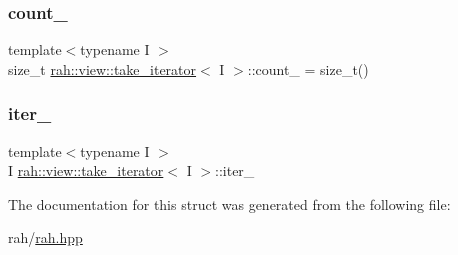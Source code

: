 \subsubsection{\texorpdfstring{count\_}{count\_}}
{\footnotesize\ttfamily template$<$typename I $>$ \\
size\+\_\+t \mbox{\hyperlink{structrah_1_1view_1_1take__iterator}{rah\+::view\+::take\+\_\+iterator}}$<$ I $>$\+::count\+\_\+ = size\+\_\+t()}

\mbox{\label{structrah_1_1view_1_1take__iterator_abbc947797abfa6ecaeb91c8185212152}} 
\subsubsection{\texorpdfstring{iter\_}{iter\_}}
{\footnotesize\ttfamily template$<$typename I $>$ \\
I \mbox{\hyperlink{structrah_1_1view_1_1take__iterator}{rah\+::view\+::take\+\_\+iterator}}$<$ I $>$\+::iter\+\_\+}



The documentation for this struct was generated from the following file\+:\begin{DoxyCompactItemize}
\item 
rah/\mbox{\hyperlink{rah_8hpp}{rah.\+hpp}}\end{DoxyCompactItemize}
